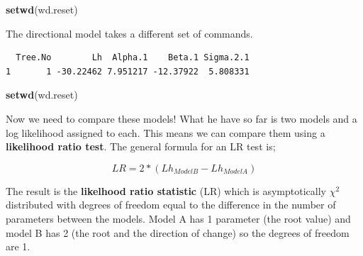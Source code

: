 \documentclass[
]{book}
\newenvironment{Shaded}{\begin{snugshade}}{\end{snugshade}}
\newcommand{\DecValTok}[1]{\textcolor[rgb]{0.00,0.00,0.81}{#1}}
\newcommand{\KeywordTok}[1]{\textcolor[rgb]{0.13,0.29,0.53}{\textbf{#1}}}
\newcommand{\NormalTok}[1]{#1}
\newcommand{\OperatorTok}[1]{\textcolor[rgb]{0.81,0.36,0.00}{\textbf{#1}}}
\newcommand{\StringTok}[1]{\textcolor[rgb]{0.31,0.60,0.02}{#1}}
\begin{document}
\begin{Shaded}
\begin{Highlighting}[]
\KeywordTok{setwd}\NormalTok{(wd.reset)}
\end{Highlighting}
\end{Shaded}

The directional model takes a different set of commands.

\begin{Shaded}
\end{Shaded}

\begin{verbatim}
  Tree.No        Lh  Alpha.1    Beta.1 Sigma.2.1
1       1 -30.22462 7.951217 -12.37922  5.808331
\end{verbatim}

\begin{Shaded}
\begin{Highlighting}[]
\KeywordTok{setwd}\NormalTok{(wd.reset)}
\end{Highlighting}
\end{Shaded}

Now we need to compare these models! What he have so far is two models and a log likelihood assigned to each. This means we can compare them using a \textbf{likelihood ratio test}. The general formula for an LR test is;

\[LR=2*(Lh_{ModelB} - Lh_{ModelA})\]

The result is the \textbf{likelhood ratio statistic} (LR) which is asymptotically \(\chi^2\) distributed with degrees of freedom equal to the difference in the number of parameters between the models. Model A has 1 parameter (the root value) and model B has 2 (the root and the direction of change) so the degrees of freedom are 1.

\begin{Shaded}
\end{Shaded}
\end{document}
